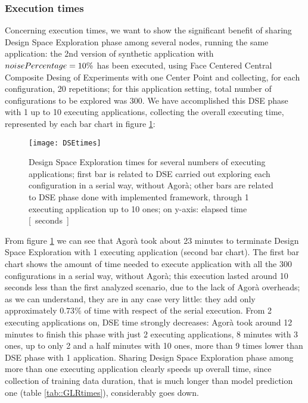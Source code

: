 \subsubsection{Execution times}

Concerning execution times, we want to show the significant benefit of sharing Design Space Exploration phase among several nodes, running the same application: the 2nd version of synthetic application with $noise\-Percentage = 10\%$ has been executed, using Face Centered Central Composite Desing of Experiments with one Center Point and collecting, for each configuration, 20 repetitions; for this application setting, total number of configurations to be explored was 300. We have accomplished this DSE phase with 1 up to 10 executing applications, collecting the overall executing time, represented by each bar chart in figure \ref{fig::DSEtimes}:

\begin{figure}[H]

    \centering
    \texttt{[image: DSEtimes]}
    \caption{Design Space Exploration times for several numbers of executing applications; first bar is related to DSE carried out exploring each configuration in a serial way, without Agorà; other bars are related to DSE phase done with implemented framework, through 1 executing application up to 10 ones; on y-axis: elapsed time \hbox{[ seconds ]}}
    \label{fig::DSEtimes}
    
\end{figure}

From figure \ref{fig::DSEtimes} we can see that Agorà took about 23 minutes to terminate Design Space Exploration with 1 executing application (second bar chart). The first bar chart shows the amount of time needed to execute application with all the 300 configurations in a serial way, without Agorà; this execution lasted around 10 seconds less than the first analyzed scenario, due to the lack of Agorà overheads; as we can understand, they are in any case very little: they add only approximately $0.73\%$ of time with respect of the serial execution. From 2 executing applications on, DSE time strongly decreases: Agorà took around 12 minutes to finish this phase with just 2 executing applications, 8 minutes with 3 ones, up to only 2 and a half minutes with 10 ones, more than 9 times lower than DSE phase with 1 application. Sharing Design Space Exploration phase among more than one executing application clearly speeds up overall time, since collection of training data duration, that is much longer than model prediction one (table \ref{tab::GLRtimes}), considerably goes down.

